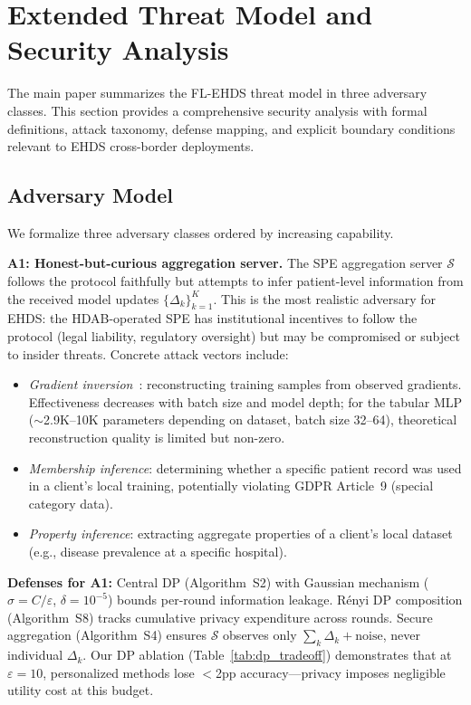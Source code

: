 \documentclass[conference]{IEEEtran}
\begin{document}
\section{Extended Threat Model and Security Analysis}
\label{sec:extended_threat}

The main paper summarizes the FL-EHDS threat model in three adversary classes. This section provides a comprehensive security analysis with formal definitions, attack taxonomy, defense mapping, and explicit boundary conditions relevant to EHDS cross-border deployments.

\subsection{Adversary Model}

We formalize three adversary classes ordered by increasing capability.

\textbf{A1: Honest-but-curious aggregation server.} The SPE aggregation server $\mathcal{S}$ follows the protocol faithfully but attempts to infer patient-level information from the received model updates $\{\Delta_k\}_{k=1}^{K}$. This is the most realistic adversary for EHDS: the HDAB-operated SPE has institutional incentives to follow the protocol (legal liability, regulatory oversight) but may be compromised or subject to insider threats. Concrete attack vectors include:
\begin{itemize}
    \item \textit{Gradient inversion}~\cite{zhu2019deep}: reconstructing training samples from observed gradients. Effectiveness decreases with batch size and model depth; for the tabular MLP ($\sim$2.9K--10K parameters depending on dataset, batch size 32--64), theoretical reconstruction quality is limited but non-zero.
    \item \textit{Membership inference}: determining whether a specific patient record was used in a client's local training, potentially violating GDPR Article~9 (special category data).
    \item \textit{Property inference}: extracting aggregate properties of a client's local dataset (e.g., disease prevalence at a specific hospital).
\end{itemize}

\textbf{Defenses for A1:} Central DP (Algorithm~S2) with Gaussian mechanism ($\sigma = C/\varepsilon$, $\delta = 10^{-5}$) bounds per-round information leakage. R\'enyi DP composition (Algorithm~S8) tracks cumulative privacy expenditure across rounds. Secure aggregation (Algorithm~S4) ensures $\mathcal{S}$ observes only $\sum_k \Delta_k + \text{noise}$, never individual $\Delta_k$. Our DP ablation (Table~\ref{tab:dp_tradeoff}) demonstrates that at $\varepsilon = 10$, personalized methods lose $<$2pp accuracy---privacy imposes negligible utility cost at this budget.
\end{document}
